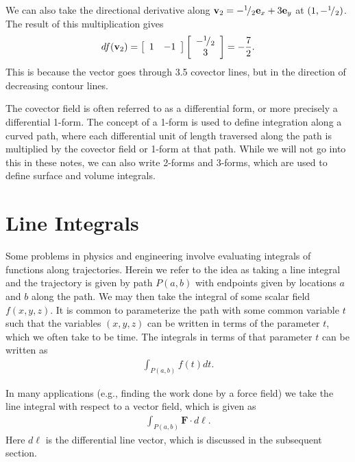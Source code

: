 We can also take the directional derivative along $\mathbf{v}_2 = -{}^{1}\!/_{2} \mathbf{e}_x + 3 \mathbf{e}_y$ at $(1,-{}^{1}\!/_{2})$. The result of this multiplication gives
\begin{align}
  df( \mathbf{v}_2 ) = \left[ \begin{array}{c c} 1 & -1 \\ \end{array} \right] 
  \left[ \begin{array}{c} -{}^{1}\!/_{2} \\ 3 \\ \end{array} \right] = -\frac{7}{2}. \nonumber
\end{align}
This is because the vector goes through 3.5 covector lines, but in the direction of decreasing contour lines.

The covector field is often referred to as a differential form, or more precisely a differential 1-form. The concept of a 1-form is used to define integration along a curved path, where each differential unit of length traversed along the path is multiplied by the covector field or 1-form at that path. While we will not go into this in these notes, we can also write 2-forms and 3-forms, which are used to define surface and volume integrals.


\section{Line Integrals}

Some problems in physics and engineering involve evaluating integrals of functions along trajectories. Herein we refer to the idea as taking a line integral and the trajectory is given by path $P(a,b)$ with endpoints given by locations $a$ and $b$ along the path. We may then take the integral of some scalar field $f(x,y,z)$. It is common to parameterize the path with some common variable $t$ such that the variables $(x,y,z)$ can be written in terms of the parameter $t$, which we often take to be time. The integrals in terms of that parameter $t$ can be written as
\begin{align}
  \int_{P(a,b)} f(t) dt .
\end{align}

In many applications (e.g., finding the work done by a force field) we take the line integral with respect to a vector field, which is given as
\begin{align}
  \int_{P(a,b)} \mathbf{F} \cdot d\boldsymbol\ell .
\end{align}
Here $d\boldsymbol\ell$ is the differential line vector, which is discussed in the subsequent section.

